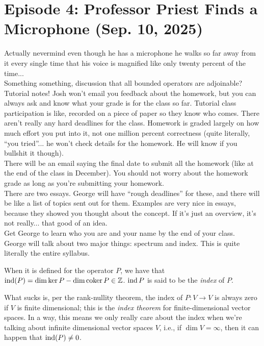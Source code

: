 \section{Episode 4: Professor Priest Finds a Microphone (Sep. 10, 2025)}
Actually nevermind even though he has a microphone he walks so far away from it every single time that his voice is magnified like only twenty percent of the time...
\\[8pt]
Something something, discussion that all bounded operators are adjoinable?
\hrulebar
\noindent Tutorial notes! Josh won't email you feedback about the homework, but you can always ask and know what your grade is for the class so far. Tutorial class participation is like, recorded on a piece of paper so they know who comes. There aren't really any hard deadlines for the class. Homework is graded largely on how much effort you put into it, not one million percent correctness (quite literally, ``you tried''... he won't check details for the homework. He will know if you bullshit it though).
\\[8pt]
There will be an email saying the final date to submit all the homework (like at the end of the class in December). You should not worry about the homework grade as long as you're submitting your homework.
\\[8pt]
There are two essays. George will have ``rough deadlines'' for these, and there will be like a list of topics sent out for them. Examples are very nice in essays, because they showed you thought about the concept. If it's just an overview, it's not really... that good of an idea.
\\[8pt]
Get George to learn who you are and your name by the end of your class.
\\[8pt]
George will talk about two major things: spectrum and index. This is quite literally the entire syllabus.
\begin{definition}
    When it is defined for the operator $P$, we have that $\operatorname{ind}(P) = \dim \ker P - \dim \operatorname{coker} P \in \mathbb Z$. $\operatorname{ind} P$ is said to be the \textit{index} of $P$.
\end{definition}
\noindent What sucks is, per the rank-nullity theorem, the index of $P : V \to V$ is always zero if $V$ is finite dimensional; this is the \textit{index theorem} for finite-dimensional vector spaces. In a way, this means we only really care about the index when we're talking about infinite dimensional vector spaces $V$, i.e., if $\dim V = \infty$, then it can happen that $\operatorname{ind}(P) \neq 0$.
\\[8pt]
